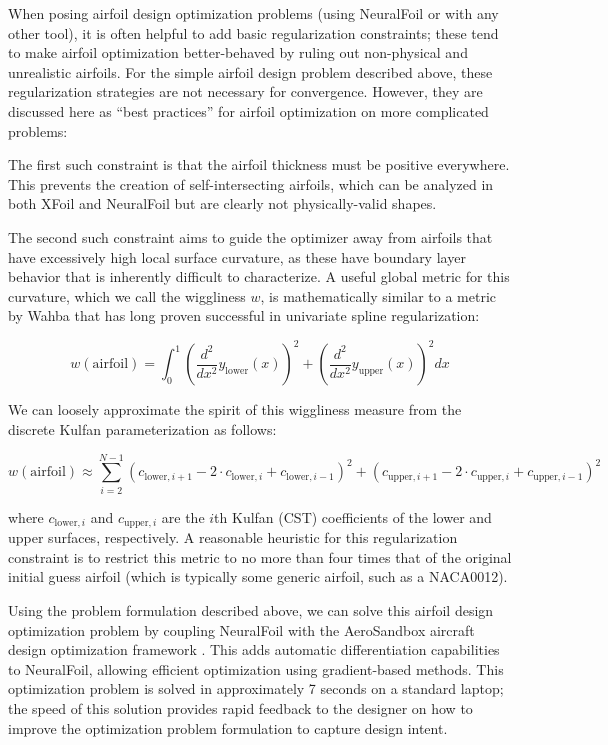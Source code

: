 \documentclass[journal]{new-aiaa}
\begin{document}
When posing airfoil design optimization problems (using NeuralFoil or with any other tool), it is often helpful to add basic regularization constraints; these tend to make airfoil optimization better-behaved by ruling out non-physical and unrealistic airfoils. For the simple airfoil design problem described above, these regularization strategies are not necessary for convergence. However, they are discussed here as ``best practices'' for airfoil optimization on more complicated problems:

The first such constraint is that the airfoil thickness must be positive everywhere. This prevents the creation of self-intersecting airfoils, which can be analyzed in both XFoil and NeuralFoil but are clearly not physically-valid shapes.

The second such constraint aims to guide the optimizer away from airfoils that have excessively high local surface curvature, as these have boundary layer behavior that is inherently difficult to characterize. A useful global metric for this curvature, which we call the wiggliness $w$, is mathematically similar to a metric by Wahba \cite{wahbaSplineModelsObservational2007} that has long proven successful in univariate spline regularization:

$$w(\mathrm{airfoil}) = \int_0^1 \left( \frac{d^2}{dx^2} y_\mathrm{lower}(x) \right)^2 + \left( \frac{d^2}{dx^2} y_\mathrm{upper}(x) \right)^2 dx$$

\noindent We can loosely approximate the spirit of this wiggliness measure from the discrete Kulfan parameterization as follows:

$$w(\mathrm{airfoil}) \approx \sum_{i=2}^{N-1} \left(c_{\mathrm{lower},i+1} - 2 \cdot c_{\mathrm{lower},i} + c_{\mathrm{lower},i-1} \right)^2 + \left(c_{\mathrm{upper},i+1} - 2 \cdot c_{\mathrm{upper},i} + c_{\mathrm{upper},i-1} \right)^2$$

\noindent where $c_{\mathrm{lower},i}$ and $c_{\mathrm{upper},i}$ are the $i$th Kulfan (CST) coefficients of the lower and upper surfaces, respectively. A reasonable heuristic for this regularization constraint is to restrict this metric to no more than four times that of the original initial guess airfoil (which is typically some generic airfoil, such as a NACA0012).

Using the problem formulation described above, we can solve this airfoil design optimization problem by coupling NeuralFoil with the AeroSandbox aircraft design optimization framework \cite{sharpeAeroSandboxDifferentiableFramework2021}. This adds automatic differentiation capabilities to NeuralFoil, allowing efficient optimization using gradient-based methods. This optimization problem is solved in approximately 7 seconds on a standard laptop; the speed of this solution provides rapid feedback to the designer on how to improve the optimization problem formulation to capture design intent.
\end{document}
